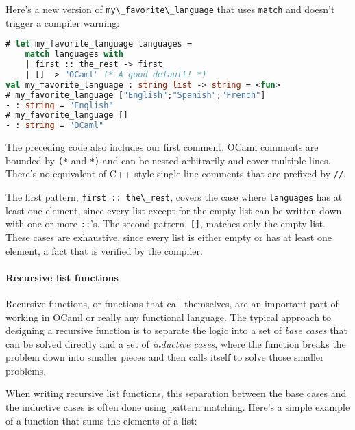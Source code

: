 Here's a new version of \passthrough{\lstinline!my\_favorite\_language!}
that uses \passthrough{\lstinline!match!} and doesn't trigger a compiler
warning:

\begin{lstlisting}[language=Caml]
# let my_favorite_language languages =
    match languages with
    | first :: the_rest -> first
    | [] -> "OCaml" (* A good default! *)
val my_favorite_language : string list -> string = <fun>
# my_favorite_language ["English";"Spanish";"French"]
- : string = "English"
# my_favorite_language []
- : string = "OCaml"
\end{lstlisting}

The preceding code also includes our first comment. OCaml comments are
bounded by \passthrough{\lstinline!(*!} and \passthrough{\lstinline!*)!}
and can be nested arbitrarily and cover multiple lines. There's no
equivalent of C++-style single-line comments that are prefixed by
\passthrough{\lstinline!//!}.

The first pattern, \passthrough{\lstinline!first :: the\_rest!}, covers
the case where \passthrough{\lstinline!languages!} has at least one
element, since every list except for the empty list can be written down
with one or more \passthrough{\lstinline!::!}'s. The second pattern,
\passthrough{\lstinline![]!}, matches only the empty list. These cases
are exhaustive, since every list is either empty or has at least one
element, a fact that is verified by the compiler.

\hypertarget{recursive-list-functions}{%
\paragraph{Recursive list functions}\label{recursive-list-functions}}

Recursive functions, or functions that call themselves, are an important
part of working in OCaml or really any functional language. The typical
approach to designing a recursive function is to separate the logic into
a set of \emph{base cases} that can be solved directly and a set of
\emph{inductive cases}, where the function breaks the problem down into
smaller pieces and then calls itself to solve those smaller
problems.

When writing recursive list functions, this separation between the base
cases and the inductive cases is often done using pattern matching.
Here's a simple example of a function that sums the elements of a list:

